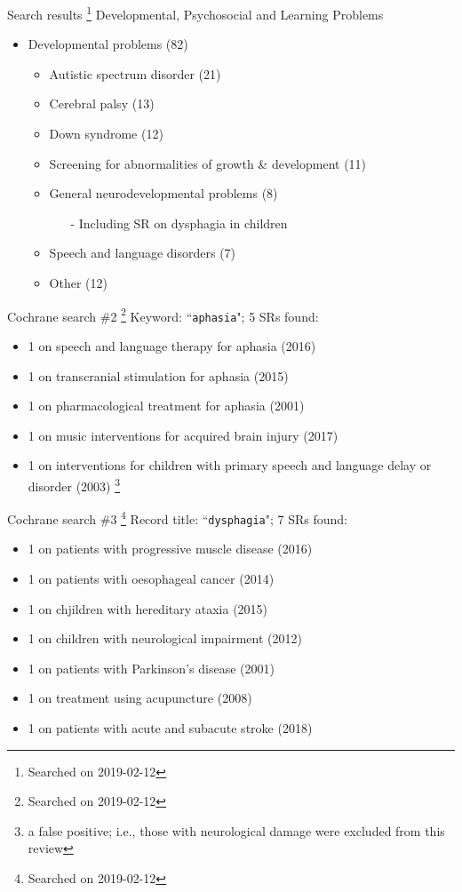 \documentclass{beamer}
\begin{document}
% 
\begin{frame}{Search results \footnote{\tiny{Searched on 2019-02-12}}}
Developmental, Psychosocial and Learning Problems
	\begin{itemize}
	\item Developmental problems (82)
		\begin{itemize}
		\item Autistic spectrum disorder (21)
		\item Cerebral palsy (13)
		\item Down syndrome (12)
		\item Screening for abnormalities of growth \& development (11)
		\item General neurodevelopmental problems (8)
			\begin{itemize}
			\item[-] Including SR on dysphagia in children
			\end{itemize}
		\item Speech and language disorders (7)
		\item Other (12)
		\end{itemize}
	\end{itemize}
\end{frame}

% 
\begin{frame}{Cochrane search \#2 \footnote{\tiny{Searched on 2019-02-12}}}
Keyword: ``\texttt{aphasia}"; 5 SRs found:
	\begin{itemize}
	\item 1 on speech and language therapy for aphasia (2016)
	\item 1 on transcranial stimulation for aphasia (2015)
	\item 1 on pharmacological treatment for aphasia (2001)
	\item 1 on music interventions for acquired brain injury (2017)
	\item 1 on interventions for children with primary speech and language delay or disorder (2003) \footnote{\tiny{a false positive; i.e., those with neurological damage were excluded from this review}}
	\end{itemize}
\end{frame}

\begin{frame}{Cochrane search \#3 \footnote{\tiny{Searched on 2019-02-12}}}
Record title: ``\texttt{dysphagia}"; 7 SRs found:
	\begin{itemize}
	\item 1 on patients with progressive muscle disease (2016)
	\item 1 on patients with oesophageal cancer (2014)
	\item 1 on chjildren with hereditary ataxia (2015)
	\item 1 on children with neurological impairment (2012)
	\item 1 on patients with Parkinson's disease (2001)
	\item 1 on treatment using acupuncture (2008)
	\item 1 on patients with acute and subacute stroke (2018)
	\end{itemize}
\end{frame}
\end{document}

